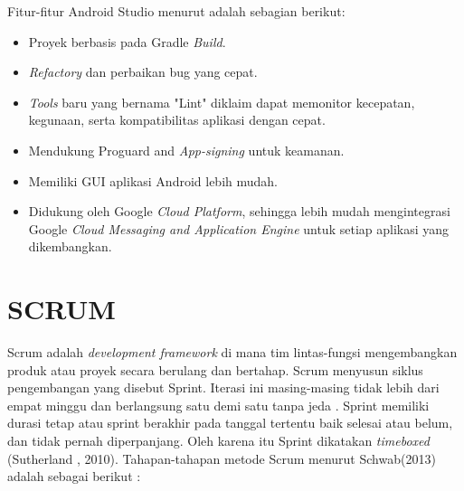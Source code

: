 \par Fitur-fitur Android Studio menurut \citep{puspitasari2020} adalah sebagian berikut:
\begin{itemize}
\item Proyek berbasis pada Gradle \textit{Build}.
\item \textit{Refactory} dan perbaikan bug yang cepat.
\item \textit{Tools} baru yang bernama "Lint" diklaim dapat memonitor kecepatan, kegunaan, serta kompatibilitas aplikasi dengan cepat.
\item Mendukung Proguard and \textit{App-signing} untuk keamanan.
\item Memiliki GUI aplikasi Android lebih mudah.
\item Didukung oleh Google \textit{Cloud Platform}, sehingga lebih mudah mengintegrasi Google \textit{Cloud Messaging and Application Engine} untuk setiap aplikasi yang dikembangkan.
\end{itemize}

\section{SCRUM}
Scrum adalah \textit{development framework} di mana tim lintas-fungsi mengembangkan produk atau proyek secara berulang dan bertahap. Scrum menyusun siklus pengembangan yang disebut Sprint. Iterasi ini masing-masing tidak lebih dari empat minggu dan berlangsung satu demi satu tanpa jeda \citep{deemer2012lightweight}. Sprint memiliki durasi tetap atau sprint berakhir pada tanggal tertentu baik selesai atau belum, dan tidak pernah diperpanjang. Oleh karena itu Sprint dikatakan \textit{timeboxed} (Sutherland , 2010). Tahapan-tahapan metode Scrum menurut Schwab(2013) adalah sebagai berikut :

